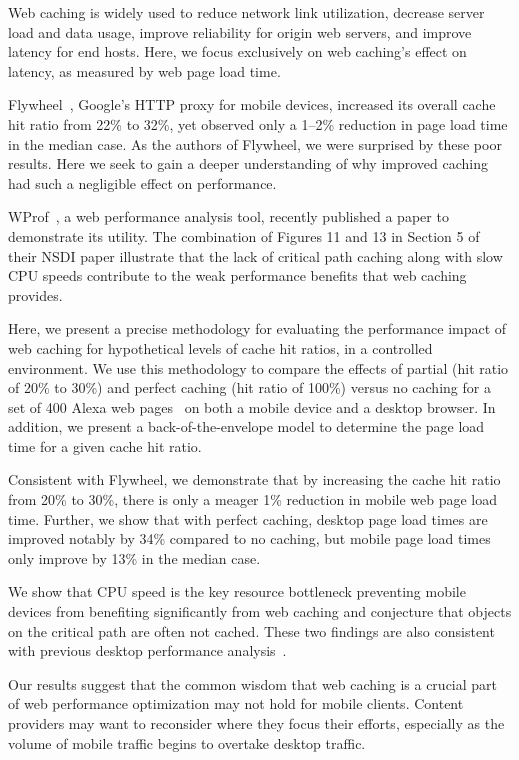 \label{intro}
Web caching is widely used to reduce network link utilization, decrease server load and data usage, improve reliability for origin web servers, and improve latency for end hosts.
Here, we focus exclusively on web caching's effect on latency, as measured by web page load time.

Flywheel~\cite{flywheel}, Google's HTTP proxy for mobile devices, increased
its overall cache hit ratio from 22\% to 32\%, yet observed only a 1--2\% reduction in page load time in the median case.
As the authors of Flywheel, we were surprised by these poor results. 
Here we seek to gain a deeper understanding of why improved caching had such a negligible effect on performance.

WProf~\cite{wang2013demystifying}, a web performance analysis tool, recently published a paper to demonstrate its utility. 
The combination of Figures 11 and 13 in Section 5 of their NSDI paper illustrate that the lack of critical path caching along with slow CPU speeds contribute to the weak performance benefits that web caching provides.

Here, we present a precise methodology for evaluating the performance impact of web caching for hypothetical levels of cache hit ratios, in a controlled environment.
We use this methodology to compare the effects of partial (hit ratio of 20\% to 30\%) and
perfect caching (hit ratio of 100\%) versus no caching for a set of 400 Alexa web pages~\cite{alexa} on both a mobile device and a desktop browser.
In addition, we present a back-of-the-envelope model to determine the page load time for a given cache hit ratio.

Consistent with Flywheel, we demonstrate that by increasing the cache hit ratio from 20\% to 30\%, there is only a meager 1\% reduction in mobile web page load time.
Further, we show that with perfect caching, desktop page load times are improved notably by 34\% compared to no caching, but mobile page load times only improve by 13\% in the median case.

We show that CPU speed is the key resource bottleneck preventing mobile devices from benefiting significantly from web caching and conjecture that objects on the critical path are often not cached. These two findings are also consistent with previous desktop performance analysis~\cite{wang2013demystifying}.

Our results suggest that the common wisdom that web caching is a crucial part of web performance optimization may not hold for mobile clients. Content providers may want to reconsider where they focus their efforts, especially as the volume of mobile traffic begins to overtake desktop traffic.

